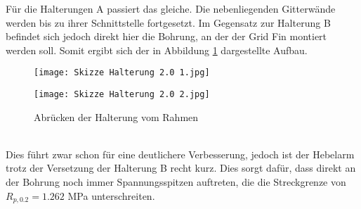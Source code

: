 Für die Halterungen A passiert das gleiche. Die nebenliegenden Gitterwände werden bis zu ihrer Schnittstelle fortgesetzt. Im Gegensatz zur Halterung B befindet sich jedoch direkt hier die Bohrung, an der der Grid Fin montiert werden soll. Somit ergibt sich der in Abbildung \ref{abb_V2-Halterung} dargestellte Aufbau.
\begin{figure}[h]
	\begin{minipage}[t]{0.45\linewidth}
		\centering
		\texttt{[image: Skizze Halterung 2.0 1.jpg]}
	\end{minipage}
	\hfill
	\begin{minipage}[t]{0.45\linewidth}
		\centering
		\texttt{[image: Skizze Halterung 2.0 2.jpg]}
	\end{minipage}
	\caption{Abrücken der Halterung vom Rahmen}
	\label{abb_V2-Halterung}
\end{figure}\\
Dies führt zwar schon für eine deutlichere Verbesserung, jedoch ist der Hebelarm trotz der Versetzung der Halterung B recht kurz. Dies sorgt dafür, dass direkt an der Bohrung noch immer Spannungsspitzen auftreten, die die Streckgrenze von $R_{p, 0.2} = 1.262$ MPa unterschreiten.

